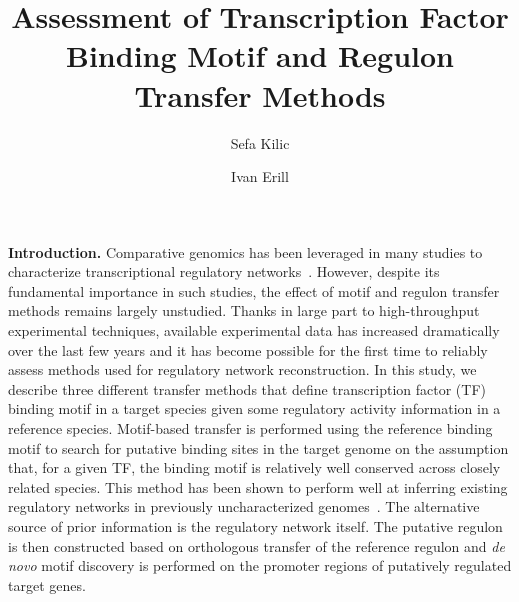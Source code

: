 \documentclass{llncs}
\begin{document}
\title{Assessment of Transcription Factor Binding Motif and Regulon Transfer
  Methods}
\author{Sefa Kilic \and Ivan Erill}

\maketitle
\textbf{Introduction.}  Comparative genomics has been leveraged in many studies
to characterize transcriptional regulatory
networks~\cite{ravcheev2013genomic,meireles2009comparative}. However, despite
its fundamental importance in such studies, the effect of motif and regulon
transfer methods remains largely unstudied. Thanks in large part to
high-throughput experimental techniques, available experimental data has
increased dramatically over the last few years and it has become possible for
the first time to reliably assess methods used for regulatory network
reconstruction. In this study, we describe three different transfer methods that
define transcription factor (TF) binding motif in a target species given some
regulatory activity information in a reference species. Motif-based transfer is
performed using the reference binding motif to search for putative binding sites
in the target genome on the assumption that, for a given TF, the binding motif
is relatively well conserved across closely related species. This method has
been shown to perform well at inferring existing regulatory networks in
previously uncharacterized
genomes~\cite{leyn2013genomic,leyn2014comparative}. The alternative source of
prior information is the regulatory network itself. The putative regulon is then
constructed based on orthologous transfer of the reference regulon and
\textit{de novo} motif discovery is performed on the promoter regions of
putatively regulated target genes.
\end{document}
